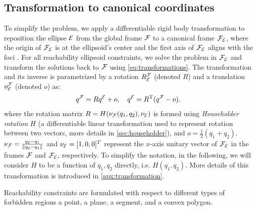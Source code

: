 \documentclass[10pt,twocolumn,twoside]{IEEEtran}
\newcommand{\new}[1]{\textcolor{blue}{#1}}
\newcommand{\news}{\color{blue}}
\begin{document}
\subsection{Transformation to canonical coordinates}\label{sec:rotation2Standard}
{\news To simplify the problem, we apply a differentiable rigid body transformation to reposition the ellipse $\mathcal{E}$ from the global frame $\mathcal{F}$ to a canonical frame $\mathcal{F}_{\mathcal{E}}$, where the origin of $\mathcal{F}_{\mathcal{E}}$ is at the ellipsoid's center and the first axis of $\mathcal{F}_{\mathcal{E}}$ aligns with the foci . For all reachability ellipsoid constraints, we solve the problem in $\mathcal{F}_{\mathcal{E}}$ and transform the solutions back to $\mathcal{F}$ using \eqref{eq:transformations}. The transformation and its inverse is parametrized by a rotation $R^{\mathcal{F}}_{\mathcal{E}}$ (denoted $R$) and a translation $o^{\mathcal{F}}_{\mathcal{E}}$ (denoted $o$) as:
\begin{equation}\label{eq:transformations}
  {q^{\mathcal{F}}}=R{q^{\mathcal{E}}}+o,\quad
  {q^{\mathcal{E}}}=R^\mathrm{T}({q^{\mathcal{F}}}-o).
\end{equation}
where the rotation matrix $R=H(\nu_{\mathcal{F}}(q_1,q_2),\nu_{\mathcal{E}})$ is formed using \emph{Householder rotation} $H$ (a differentiable linear transformation used to represent rotation between two vectors, more details in \cref{sec:householder}), and $o =\frac{1}{2}(q_1+q_2)$. $\nu_{\mathcal{F}} = \frac{q_2-q_1}{\lVert q_2-q_1\rVert}$ and $\nu_{\mathcal{E}} =[1,0,0]^T$ represent the $x$-axis unitary vector of $\mathcal{F}_{\mathcal{E}}$ in the frames $\mathcal{F}$ and $\mathcal{F}_{\mathcal{E}}$, respectively. To simplify the notation, in the following, we will consider $H$ to be a function of $q_1,q_2$ directly, i.e. $H(q_1,q_2)$. More details of this transformation is introduced in \cref{apx:transformation}.

  Reachability constraints are formulated with respect to different types of forbidden regions a point, a plane, a segment, and a convex polygon.}
\end{document}

